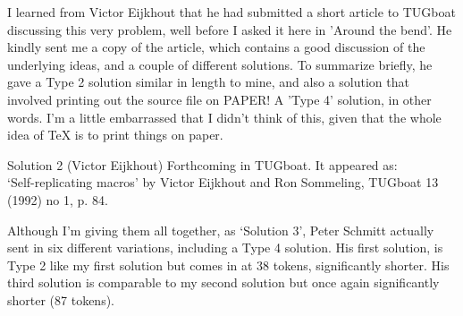 I learned from Victor Eijkhout that he had submitted a short article
to TUGboat discussing this very problem, well before I asked it here in
'Around the bend'. He kindly sent me a copy of the article, which
contains a good discussion of the underlying ideas, and a couple of
different solutions. To summarize briefly, he gave a Type 2 solution
similar in length to mine, and also a solution that involved
printing out the source file on PAPER! A 'Type 4' solution, in other
words. I'm a little embarrassed that I didn't think of this, given that
the whole idea of TeX is to print things on paper.

\begin{solution}{Solution 2 (Victor Eijkhout)}
Forthcoming in TUGboat. It appeared as: \\
`Self-replicating macros' by Victor Eijkhout and Ron Sommeling, TUGboat
13 (1992) no 1, p. 84.
\end{solution}

Although I'm giving them all together, as `Solution 3', Peter Schmitt
actually sent in six different variations, including a Type 4 solution.
His first solution,  is Type 2 like my first solution but
comes in at 38 tokens, significantly shorter. His third solution is
comparable to my second solution but once again significantly shorter
(87 tokens).

